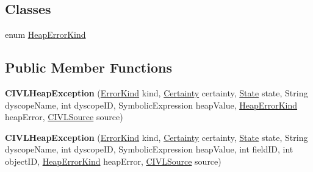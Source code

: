 \subsection*{Classes}
\begin{DoxyCompactItemize}
\item 
enum \hyperlink{enumedu_1_1udel_1_1cis_1_1vsl_1_1civl_1_1state_1_1IF_1_1CIVLHeapException_1_1HeapErrorKind}{Heap\+Error\+Kind}
\end{DoxyCompactItemize}
\subsection*{Public Member Functions}
\begin{DoxyCompactItemize}
\item 
\hypertarget{classedu_1_1udel_1_1cis_1_1vsl_1_1civl_1_1state_1_1IF_1_1CIVLHeapException_a75da5d87a2af94779e435f1ee1a5bcab}{}{\bfseries C\+I\+V\+L\+Heap\+Exception} (\hyperlink{enumedu_1_1udel_1_1cis_1_1vsl_1_1civl_1_1model_1_1IF_1_1CIVLException_1_1ErrorKind}{Error\+Kind} kind, \hyperlink{enumedu_1_1udel_1_1cis_1_1vsl_1_1civl_1_1model_1_1IF_1_1CIVLException_1_1Certainty}{Certainty} certainty, \hyperlink{interfaceedu_1_1udel_1_1cis_1_1vsl_1_1civl_1_1state_1_1IF_1_1State}{State} state, String dyscope\+Name, int dyscope\+I\+D, Symbolic\+Expression heap\+Value, \hyperlink{enumedu_1_1udel_1_1cis_1_1vsl_1_1civl_1_1state_1_1IF_1_1CIVLHeapException_1_1HeapErrorKind}{Heap\+Error\+Kind} heap\+Error, \hyperlink{interfaceedu_1_1udel_1_1cis_1_1vsl_1_1civl_1_1model_1_1IF_1_1CIVLSource}{C\+I\+V\+L\+Source} source)\label{classedu_1_1udel_1_1cis_1_1vsl_1_1civl_1_1state_1_1IF_1_1CIVLHeapException_a75da5d87a2af94779e435f1ee1a5bcab}

\item 
\hypertarget{classedu_1_1udel_1_1cis_1_1vsl_1_1civl_1_1state_1_1IF_1_1CIVLHeapException_ab6e2768e873ff40c6c5b5772338f6418}{}{\bfseries C\+I\+V\+L\+Heap\+Exception} (\hyperlink{enumedu_1_1udel_1_1cis_1_1vsl_1_1civl_1_1model_1_1IF_1_1CIVLException_1_1ErrorKind}{Error\+Kind} kind, \hyperlink{enumedu_1_1udel_1_1cis_1_1vsl_1_1civl_1_1model_1_1IF_1_1CIVLException_1_1Certainty}{Certainty} certainty, \hyperlink{interfaceedu_1_1udel_1_1cis_1_1vsl_1_1civl_1_1state_1_1IF_1_1State}{State} state, String dyscope\+Name, int dyscope\+I\+D, Symbolic\+Expression heap\+Value, int field\+I\+D, int object\+I\+D, \hyperlink{enumedu_1_1udel_1_1cis_1_1vsl_1_1civl_1_1state_1_1IF_1_1CIVLHeapException_1_1HeapErrorKind}{Heap\+Error\+Kind} heap\+Error, \hyperlink{interfaceedu_1_1udel_1_1cis_1_1vsl_1_1civl_1_1model_1_1IF_1_1CIVLSource}{C\+I\+V\+L\+Source} source)\label{classedu_1_1udel_1_1cis_1_1vsl_1_1civl_1_1state_1_1IF_1_1CIVLHeapException_ab6e2768e873ff40c6c5b5772338f6418}


\end{DoxyCompactItemize}
